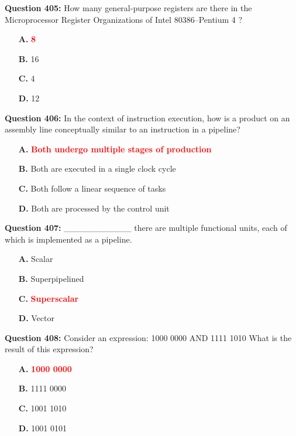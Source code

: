 \documentclass[12pt,a4paper]{article}
\begin{document}
\vspace{0.5cm}

\textbf{Question 405:} How many general-purpose registers are there in the Microprocessor Register Organizations of Intel 80386–Pentium 4 ?

\begin{itemize}
    \item[\textbf{A.}] \textcolor{red}{\textbf{8}}
    \item[\textbf{B.}] 16
    \item[\textbf{C.}] 4
    \item[\textbf{D.}] 12
\end{itemize}

\vspace{0.5cm}

\textbf{Question 406:} In the context of instruction execution, how is a product on an assembly line conceptually similar to an instruction in a pipeline?

\begin{itemize}
    \item[\textbf{A.}] \textcolor{red}{\textbf{Both undergo multiple stages of production}}
    \item[\textbf{B.}] Both are executed in a single clock cycle
    \item[\textbf{C.}] Both follow a linear sequence of tasks
    \item[\textbf{D.}] Both are processed by the control unit
\end{itemize}

\vspace{0.5cm}

\textbf{Question 407:} ___________ there are multiple functional units, each of which is implemented as a pipeline.

\begin{itemize}
    \item[\textbf{A.}] Scalar
    \item[\textbf{B.}] Superpipelined
    \item[\textbf{C.}] \textcolor{red}{\textbf{Superscalar}}
    \item[\textbf{D.}] Vector
\end{itemize}

\vspace{0.5cm}

\textbf{Question 408:} Consider an expression: 1000 0000 AND 1111 1010 What is the result of this expression?

\begin{itemize}
    \item[\textbf{A.}] \textcolor{red}{\textbf{1000 0000}}
    \item[\textbf{B.}] 1111 0000
    \item[\textbf{C.}] 1001 1010
    \item[\textbf{D.}] 1001 0101
\end{itemize}
\end{document}
